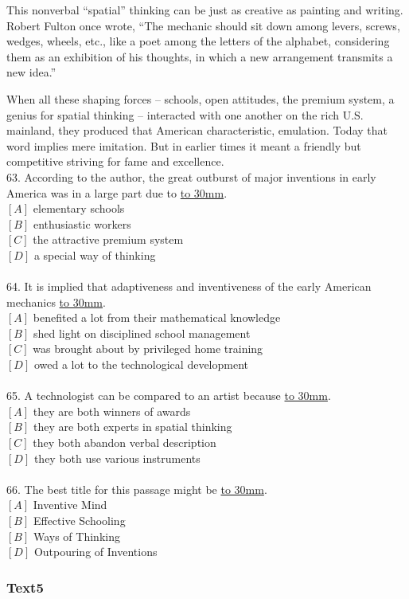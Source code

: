 \documentclass[a4paper]{article}
\begin{document}
\par
This nonverbal “spatial” thinking can be just as creative as painting and writing. Robert Fulton once wrote, “The mechanic should sit down among levers, screws, wedges, wheels, etc., like a poet among the letters of the alphabet, considering them as an exhibition of his thoughts, in which a new arrangement transmits a new idea.”

\par
When all these shaping forces -- schools, open attitudes, the premium system, a genius for spatial thinking -- interacted with one another on the rich U.S. mainland, they produced that American characteristic, emulation. Today that word implies mere imitation. But in earlier times it meant a friendly but competitive striving for fame and excellence.
\\63.	According to the author, the great outburst of major inventions in early America was in a large part due to \underline{\hbox to 30mm{}}.\\$[A]$ elementary schools\\$[B]$ enthusiastic workers\\$[C]$ the attractive premium system\\$[D]$ a special way of thinking\\\\64.	It is implied that adaptiveness and inventiveness of the early American mechanics \underline{\hbox to 30mm{}}.\\$[A]$ benefited a lot from their mathematical knowledge\\$[B]$ shed light on disciplined school management\\$[C]$ was brought about by privileged home training\\$[D]$ owed a lot to the technological development\\\\65.	A technologist can be compared to an artist because \underline{\hbox to 30mm{}}.\\$[A]$ they are both winners of awards\\$[B]$ they are both experts in spatial thinking\\$[C]$ they both abandon verbal description\\$[D]$ they both use various instruments\\\\66.	The best title for this passage might be \underline{\hbox to 30mm{}}.\\$[A]$ Inventive Mind\\$[B]$ Effective Schooling\\$[B]$ Ways of Thinking\\$[D]$ Outpouring of Inventions\\\subsubsection{Text5}
\end{document}
